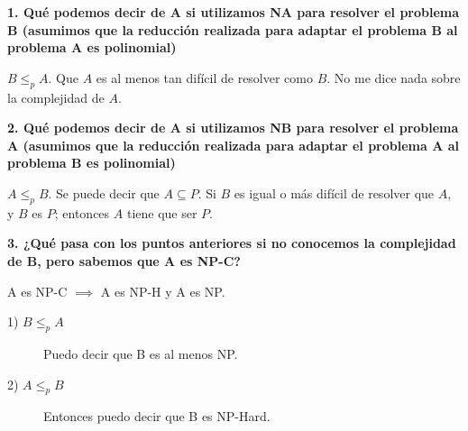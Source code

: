 \documentclass[../tp3_grupo404.tex]{subfiles}
\begin{document}
\noindent\textbf{1. Qué podemos decir de A si utilizamos NA para resolver el problema B
(asumimos que la reducción realizada para adaptar el problema B al problema A es polinomial)}

$B \leq_p A$. Que $A$ es al menos tan difícil de resolver como $B$.
No me dice nada sobre la complejidad de $A$.

\vspace{15mm}\noindent\textbf{2. Qué podemos decir de A si utilizamos NB para resolver el problema A
(asumimos que la reducción realizada para adaptar el problema A al problema B es polinomial)}

$A \leq_p B$. Se puede decir que $A \subseteq P$.
Si $B$ es igual o más difícil de resolver que $A$, y $B$ es $P$; entonces $A$ tiene que ser $P$.

\vspace{15mm}\noindent\textbf{3. ¿Qué pasa con los puntos anteriores si no conocemos la complejidad de B,
pero sabemos que A es NP-C?}

A es NP-C $\implies$ A es NP-H y A es NP.

\begin{description}
    \item[1) $B \leq_p A$] Puedo decir que B es al menos NP.
    \item[2) $A \leq_p B$] Entonces puedo decir que B es NP-Hard.
\end{description}
\end{document}
